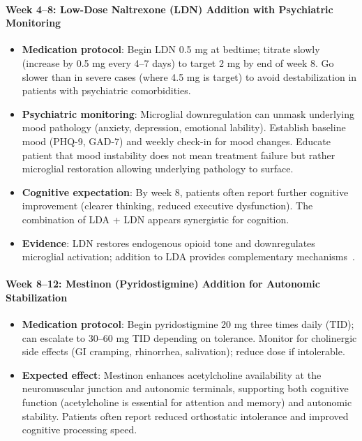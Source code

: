 \begin{protocol}
\paragraph{Week 4--8: Low-Dose Naltrexone (LDN) Addition with Psychiatric Monitoring}

\begin{itemize}
    \item \textbf{Medication protocol}: Begin LDN 0.5 mg at bedtime; titrate slowly (increase by 0.5 mg every 4--7 days) to target 2 mg by end of week 8. Go slower than in severe cases (where 4.5 mg is target) to avoid destabilization in patients with psychiatric comorbidities.

    \item \textbf{Psychiatric monitoring}: Microglial downregulation can unmask underlying mood pathology (anxiety, depression, emotional lability). Establish baseline mood (PHQ-9, GAD-7) and weekly check-in for mood changes. Educate patient that mood instability does not mean treatment failure but rather microglial restoration allowing underlying pathology to surface.

    \item \textbf{Cognitive expectation}: By week 8, patients often report further cognitive improvement (clearer thinking, reduced executive dysfunction). The combination of LDA + LDN appears synergistic for cognition.

    \item \textbf{Evidence}: LDN restores endogenous opioid tone and downregulates microglial activation; addition to LDA provides complementary mechanisms~\cite{NIH2024MECFSRoadmap}.
\end{itemize}

\paragraph{Week 8--12: Mestinon (Pyridostigmine) Addition for Autonomic Stabilization}

\begin{itemize}
    \item \textbf{Medication protocol}: Begin pyridostigmine 20 mg three times daily (TID); can escalate to 30--60 mg TID depending on tolerance. Monitor for cholinergic side effects (GI cramping, rhinorrhea, salivation); reduce dose if intolerable.

    \item \textbf{Expected effect}: Mestinon enhances acetylcholine availability at the neuromuscular junction and autonomic terminals, supporting both cognitive function (acetylcholine is essential for attention and memory) and autonomic stability. Patients often report reduced orthostatic intolerance and improved cognitive processing speed.


\end{itemize}
\end{protocol}
